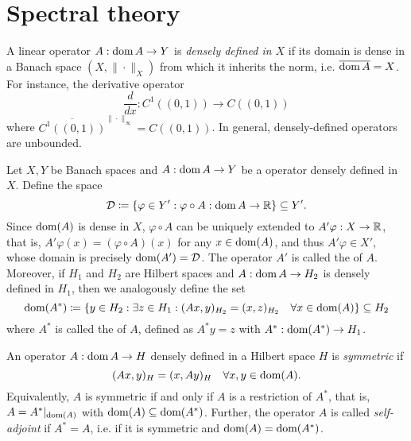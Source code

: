 \section{Spectral theory}\label{sec:spectral-theory}
\begin{definition}\label{def:densely-defined}
    A linear operator $A:\operatorname{\text{dom}} A \to Y$ is \emph{densely defined in $X$} if its domain is dense in a Banach space $(X,\|\cdot\|_X)$ from which it inherits the norm, i.e. $\overline{\operatorname{\text{dom}} A} = X$. For instance, the derivative operator 
    \begin{equation*}
        \frac{d}{dx}:C^1((0,1))\to C((0,1))
    \end{equation*}
    where $\overline{C^1((0,1))}^{\|\cdot\|_\infty} = C((0,1))$. In general, densely-defined operators are unbounded.
\end{definition}
\begin{definition}\label{def:transpose-adjoint}
    Let $X, Y$ be Banach spaces and $A:\operatorname{\text{dom}} A \to Y$ be a operator densely defined in $X$. Define the space
    \begin{equation}
        \mathcal{D}  \coloneqq  \{\varphi\in Y': \varphi\circ A:\operatorname{\text{dom}} A\to \mathbb{R} \}\subseteq Y'.
    \end{equation}
    Since $\operatorname{\text{dom}}(A)$ is dense in $X$, $\varphi\circ A$ can be uniquely extended to $A'\varphi:X\to \mathbb{R}$, that is, $A'\varphi(x) = (\varphi\circ A)(x)$ for any $x\in\operatorname{\text{dom}}(A)$, and thus $A'\varphi\in X'$, whose domain is precisely $\operatorname{\text{dom}}(A') = \mathcal{D}$. The operator $A'$ is called the  of $A$. Moreover, if $H_1$ and $H_2$ are Hilbert spaces and $A:\operatorname{\text{dom}} A\to H_2$ is densely defined in $H_1$, then we analogously define the set 
    \begin{equation}
        \operatorname{\text{dom}}(A^*)  \coloneqq  \{y\in H_2: \exists z\in H_1: (Ax,y)_{H_2} = (x,z)_{H_2}\quad \forall x\in\operatorname{\text{dom}}(A)\}\subseteq H_2
    \end{equation}
    where $A^*$ is called the  of $A$, defined as $A^*y = z$ with $A^*:\operatorname{\text{dom}}(A^*)\to H_1$.
\end{definition}
\begin{definition}\label{def:symmetric-selfadjoint}
    An operator $A:\operatorname{\text{dom}} A\to H$ densely defined in a Hilbert space $H$ is \emph{symmetric} if 
    \begin{equation}
        (Ax,y)_H = (x,Ay)_H \quad \forall x,y\in\operatorname{\text{dom}}(A).
    \end{equation}
    Equivalently, $A$ is symmetric if and only if $A$ is a restriction of $A^*$, that is, $A=A^*|_{\operatorname{\text{dom}}(A)}$ with $\operatorname{\text{dom}}(A)\subseteq \operatorname{\text{dom}}(A^*)$. Further, the operator $A$ is called \emph{self-adjoint} if $A^*=A$, i.e. if it is symmetric and $\operatorname{\text{dom}}(A) = \operatorname{\text{dom}}(A^*)$.  
\end{definition}
